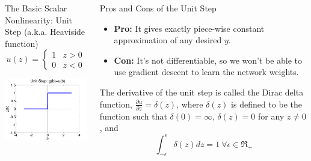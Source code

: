 \documentclass{beamer}
\begin{document}
\begin{frame}
  \begin{columns}[t]
    \begin{column}{1.85in}
      \begin{block}{The Basic Scalar  Nonlinearity: Unit Step (a.k.a. Heaviside function)}
        \[
        u\left(z\right)=\begin{cases}
        1 & z > 0\\
        0 & z < 0
        \end{cases}
        \]
        \centerline{\includegraphics[width=1.75in]{figs/nn_unitstep.png}}
      \end{block}
    \end{column}
    \begin{column}{2.65in}
      \begin{block}{Pros and Cons of the Unit Step}
        \begin{itemize}
        \item {\bf Pro:} It gives exactly piece-wise constant
          approximation of any desired $y$.
        \item {\bf Con:} It's not differentiable, so we won't be able to
          use gradient descent to learn the network weights.
        \end{itemize}
        The derivative of the unit step is called the Dirac delta
        function, $\frac{\partial u}{\partial z}=\delta(z)$, where
        $\delta(z)$ is defined to be the function such that
        $\delta(0)=\infty$, $\delta(z)=0$ for any $z\ne 0$, and
        \begin{displaymath}
          \int_{-\epsilon}^\epsilon \delta(z)dz=1~\forall\epsilon\in\Re_{+}
        \end{displaymath}
      \end{block}
    \end{column}
  \end{columns}
\end{frame}
\end{document}
